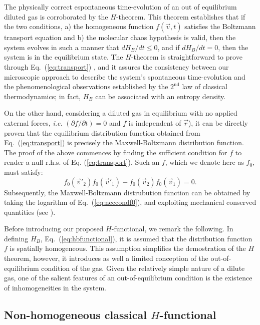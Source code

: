 The physically correct espontaneous time-evolution of an out of equilibrium diluted gas 
is corroborated by the $H$-theorem.
This theorem establishes that if the two conditions, a) the homogeneous
function $f(\vec{v},t)$ satisfies the Boltzmann
transport equation and b) the molecular chaos hypothesis is valid, then
the system evolves in such a manner that $dH_B/dt\leq0$, and if $dH_B/dt=0$, 
then the system is in the equilibrium state. 
The $H$-theorem is straightforward to prove through Eq.~(\ref{eq:transport}) \cite{bib:huang}, 
and it assures the consistency between our microscopic approach to describe the system's spontaneous 
time-evolution and the phenomenological observations
established by the $2^{\textrm{nd}}$ law of classical thermodynamics; in fact,
$H_B$ can be associated with an entropy density.

On the other hand, considering a diluted gas in equilibrium
with no applied external forces, \textit{i.e.}
$(\partial f/\partial t)=0$ and $f$ is independent of $\vec r$), 
it can be directly proven that the equilibrium distribution function obtained from
Eq.~(\ref{eq:transport}) is precisely the Maxwell-Boltzmann
distribution function. The proof of the above commences by finding the sufficient
condition for $f$ to render a null r.h.s. of Eq. (\ref{eq:transport}). Such an
$f$, which we denote here as $f_0$, must satisfy:
%
\begin{equation}\label{eq:neccondf0}
    f_0(\vec{v}'_2)f_0(\vec{v}'_1)- f_0(\vec{v}_2)f_0(\vec{v}_1)=0.
\end{equation}
%
Subsequently, the Maxwell-Boltzmann distrubution function can be obtained by
taking the logarithm of Eq.~(\ref{eq:neccondf0}), and exploiting mechanical
conserved quantities (see \cite[ch. 4.2]{bib:huang}).

Before introducing our proposed $H$-functional, we remark the following. In defining
$H_B$, Eq.~(\ref{eq:hbfunctional}), it is assumed that the distribution function 
$f$ is spatially homogeneous. This assumption simplifies the demostration 
of the $H$ theorem, however, it introduces as well a limited conception
of the out-of-equilibrium condition of the gas. Given the relatively simple nature of a dilute 
gas, one of the salient features of an out-of-equilibrium condition is the existence of
inhomogeneities in the system.

\subsection{Non-homogeneous classical $H$-functional}

